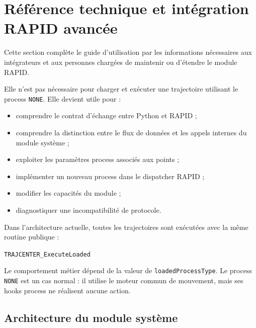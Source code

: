 \documentclass{rapportENSAM}
\begin{document}
\FloatBarrier




\section{Référence technique et intégration RAPID avancée}
\label{sec:rapid-advanced-integration}

Cette section complète le guide d'utilisation par les informations nécessaires
aux intégrateurs et aux personnes chargées de maintenir ou d'étendre le module
RAPID.

Elle n'est pas nécessaire pour charger et exécuter une trajectoire utilisant le
process \texttt{NONE}. Elle devient utile pour :

\begin{itemize}
    \item comprendre le contrat d'échange entre Python et RAPID ;
    \item comprendre la distinction entre le flux de données et les appels
    internes du module système ;
    \item exploiter les paramètres process associés aux points ;
    \item implémenter un nouveau process dans le dispatcher RAPID ;
    \item modifier les capacités du module ;
    \item diagnostiquer une incompatibilité de protocole.
\end{itemize}

Dans l'architecture actuelle, toutes les trajectoires sont exécutées avec la
même routine publique :

\begin{center}
    \texttt{TRAJCENTER\_ExecuteLoaded}
\end{center}

Le comportement métier dépend de la valeur de
\texttt{loadedProcessType}. Le process \texttt{NONE} est un cas normal : il
utilise le moteur commun de mouvement, mais ses hooks process ne réalisent
aucune action.


\subsection{Architecture du module système}
\label{subsec:rapid-system-module}
\end{document}
